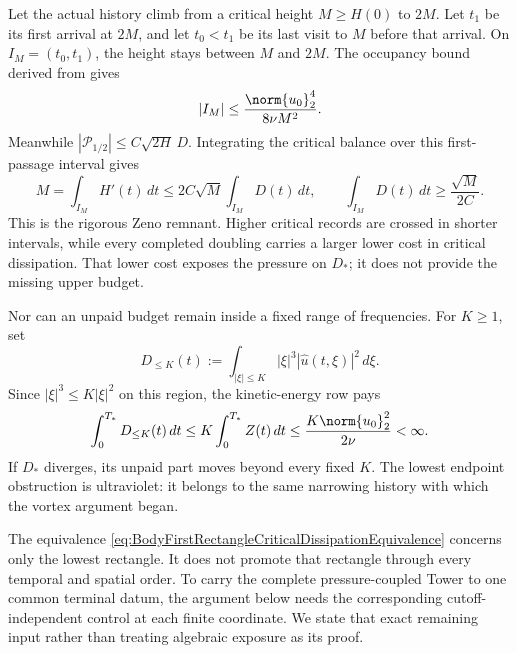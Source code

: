 Let the actual history climb from a critical height \(M\geq H(0)\) to
\(2M\).  Let \(t_1\) be its first arrival at \(2M\), and let \(t_0<t_1\) be
its last visit to \(M\) before that arrival.  On
\(I_M=(t_0,t_1)\), the height stays between \(M\) and \(2M\).  The occupancy
bound derived from  gives
\begin{equation}\label{eq:BodyCriticalDoublingIntervalLength}
  |I_M|
  \leq\frac{\norm{u_0}_2^4}{8\nu M^2}.
\end{equation}
Meanwhile
\(|\mathcal P_{1/2}|\leq C\sqrt{2H}\,D\).  Integrating the critical balance
over this first-passage interval gives
\begin{equation}\label{eq:BodyCriticalDoublingDissipationCost}
  M
  =\int_{I_M}H'(t)\,dt
  \leq2C\sqrt M\int_{I_M}D(t)\,dt,
  \qquad
  \int_{I_M}D(t)\,dt\geq\frac{\sqrt M}{2C}.
\end{equation}
This is the rigorous Zeno remnant.  Higher critical records are crossed in
shorter intervals, while every completed doubling carries a larger lower cost
in critical dissipation.  That lower cost exposes the pressure on \(D_*\); it
does not provide the missing upper budget.

Nor can an unpaid budget remain inside a fixed range of frequencies.  For
\(K\geq1\), set
\[
  D_{\leq K}(t)
  :=\int_{|\xi|\leq K}|\xi|^3|\widehat u(t,\xi)|^2\,d\xi.
\]
Since \(|\xi|^3\leq K|\xi|^2\) on this region, the kinetic-energy row pays
\begin{equation}\label{eq:BodyFixedFrequencyCriticalDissipation}
  \int_0^{T_*}D_{\leq K}(t)\,dt
  \leq K\int_0^{T_*}Z(t)\,dt
  \leq\frac{K\norm{u_0}_2^2}{2\nu}<\infty.
\end{equation}
If \(D_*\) diverges, its unpaid part moves beyond every fixed \(K\).  The
lowest endpoint obstruction is ultraviolet: it belongs to the same narrowing
history with which the vortex argument began.

The equivalence
\eqref{eq:BodyFirstRectangleCriticalDissipationEquivalence} concerns only the
lowest rectangle.  It does not promote that rectangle through every temporal
and spatial order.  To carry the complete pressure-coupled Tower to one common
terminal datum, the argument below needs the corresponding cutoff-independent
control at each finite coordinate.  We state that exact remaining input rather
than treating algebraic exposure as its proof.

